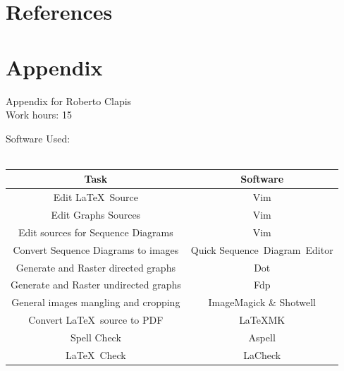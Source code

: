 \documentclass{article}
\begin{document}
\section{References}
\clearpage
\section{Appendix}
Appendix for Roberto Clapis\\
Work hours: 15
\begin{center}
	Software Used:\\
	\-\\
	\begin{tabular}{*{2}{c}}
		\toprule
		Task & Software \\
		\midrule
		Edit \LaTeX\ Source & Vim\\
		Edit Graphs Sources & Vim\\
		Edit sources for Sequence Diagrams & Vim\\
		Convert Sequence Diagrams to images & Quick Sequence Diagram Editor\\
		Generate and Raster directed graphs& Dot\\
		Generate and Raster undirected graphs& Fdp\\
		General images mangling and cropping & ImageMagick \& Shotwell\\
		Convert \LaTeX\ source to PDF & \LaTeX\-MK\\
		Spell Check & Aspell \\
		\LaTeX\ Check & LaCheck\\
		\bottomrule
	\end{tabular}
\end{center}
\-\\
\-\\

\end{document}
